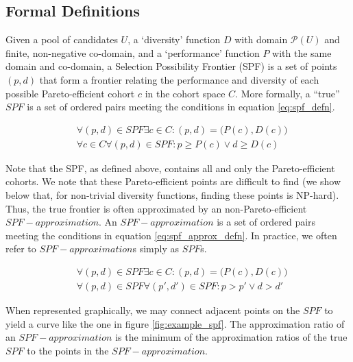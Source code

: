 \subsection{Formal Definitions}
Given a pool of candidates $U$, a `diversity' function $D$ with domain $\mathcal{P} (U)$ and finite, non-negative co-domain, and a `performance' function $P$ with the same domain and co-domain, a Selection Possibility Frontier (SPF) is a set of points $(p, d)$ that form a frontier relating the performance and diversity of each possible Pareto-efficient cohort $c$ in the cohort space $C$. More formally, a ``true'' $SPF$ is a set of ordered pairs meeting the conditions in equation \ref{eq:spf_defn}.

\begin{equation}
    \label{eq:spf_defn}
    \begin{split}
        &\forall (p, d) \in SPF \exists c \in C :(p, d) = \bigl( P(c), D(c) \bigr)  \\
        & \forall c \in C \forall (p, d) \in SPF :p \geq P(c) \lor d \geq D(c)
    \end{split}
\end{equation}

Note that the SPF, as defined above, contains all and only the Pareto-efficient cohorts. We note that these Pareto-efficient points are difficult to find (we show below that, for non-trivial diversity functions, finding these points is NP-hard). Thus, the true frontier is often approximated by an non-Pareto-efficient $SPF-approximation$. An $SPF-approximation$ is a set of ordered pairs meeting the conditions in equation \ref{eq:spf_approx_defn}. In practice, we often refer to $SPF-approximation$s simply as $SPF$s.

\begin{equation}
    \label{eq:spf_approx_defn}
    \begin{split}
        &\forall (p, d) \in SPF \exists c \in C :(p, d) = \bigl( P(c), D(c) \bigr)  \\
        &\forall (p, d) \in SPF \forall (p', d') \in SPF :p > p' \lor d > d'
    \end{split}
\end{equation}

When represented graphically, we may connect adjacent points on the $SPF$ to yield a curve like the one in figure \ref{fig:example_spf}. The approximation ratio of an $SPF-approximation$ is the minimum of the approximation ratios of the true $SPF$ to the points in the $SPF-approximation$.

